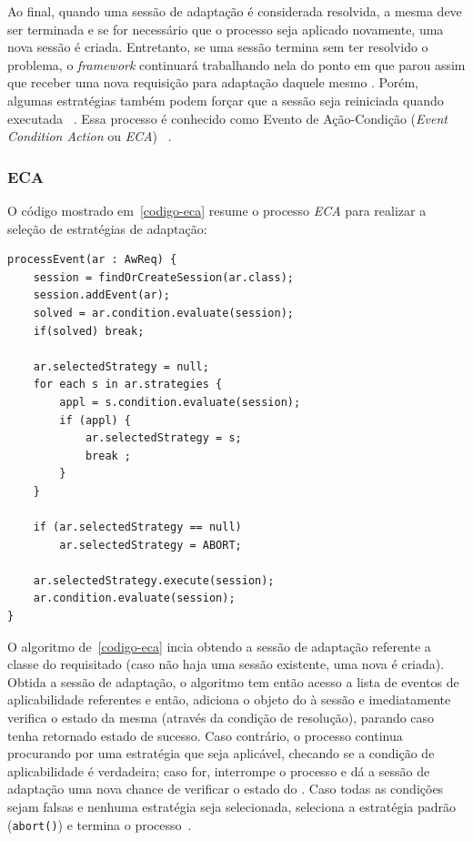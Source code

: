 Ao final, quando uma sessão de adaptação é considerada resolvida, a mesma deve ser terminada e se for necessário que o processo seja aplicado novamente, uma nova sessão é criada. Entretanto, se uma sessão termina sem ter resolvido o problema, o \textit{framework} continuará trabalhando nela do ponto em que parou assim que receber uma nova requisição para adaptação daquele mesmo \awreq. Porém, algumas estratégias também podem forçar que a sessão seja reiniciada quando executada ~\cite{souza2013requirements}. Essa processo é conhecido como Evento de Ação-Condição (\textit{Event Condition Action} ou \textit{ECA}) ~\cite{morin2009models}.

\subsubsection{ECA}
\label{sec-referencial-zanshin-eca}

O código mostrado em~\ref{codigo-eca} resume o processo \textit{ECA} para realizar a seleção de estratégias de adaptação:

\begin{lstlisting}[caption={Código do processo ECA},label={codigo-eca}]
processEvent(ar : AwReq) {
	session = findOrCreateSession(ar.class);
	session.addEvent(ar);
	solved = ar.condition.evaluate(session);
	if(solved) break;

	ar.selectedStrategy = null;
	for each s in ar.strategies {
		appl = s.condition.evaluate(session);
		if (appl) {
			ar.selectedStrategy = s;
			break ;
		}
	}

	if (ar.selectedStrategy == null)
		ar.selectedStrategy = ABORT;

	ar.selectedStrategy.execute(session);
	ar.condition.evaluate(session);
}
\end{lstlisting}

O algoritmo de~\ref{codigo-eca} incia obtendo a sessão de adaptação referente a classe do \awreq requisitado (caso não haja uma sessão existente, uma nova é criada). Obtida a sessão de adaptação, o algoritmo tem então acesso a lista de eventos de aplicabilidade referentes e então, adiciona o objeto do \awreq à sessão e imediatamente verifica o estado da mesma (através da condição de resolução), parando caso tenha retornado estado de sucesso. Caso contrário, o processo continua procurando por uma estratégia que seja aplicável, checando se a condição de aplicabilidade é verdadeira; caso for, interrompe o processo e dá a sessão de adaptação uma nova chance de verificar o estado do \awreq. Caso todas as condições sejam falsas e nenhuma estratégia seja selecionada, seleciona a estratégia padrão (\texttt{abort()}) e termina o processo~\cite{tesevitor}. 

